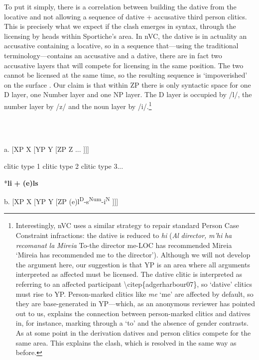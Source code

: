 \documentclass[output=paper,modfonts,nonflat]{langsci/langscibook}
\begin{document}
To put it simply, there is a correlation between building the dative from the locative and not allowing a sequence of dative + accusative third person clitics. This is precisely what we expect if the clash emerges in syntax, through the licensing by heads within Sportiche’s area. In nVC, the dative is in actuality an accusative containing a locative, so in a sequence that—using the traditional terminology—contains an accusative and a dative, there are in fact two accusative layers that will compete for licensing in the same position. The two cannot be licensed at the same time, so the resulting sequence is ‘impoverished’ on the surface . Our claim is that within ZP there is only syntactic space for one D layer, one Number layer and one NP layer. The D layer is occupied by /l/, the number layer by /z/ and the noun layer by /i/.\footnote{Interestingly, nVC uses a similar strategy to repair standard Person Case Constraint infractions: the dative is reduced to \textit{hi} (\textit{Al} \textit{director,} \textit{m’hi} \textit{ha} \textit{recomanat} \textit{la} \textit{Mireia} To-the director me-LOC has recommended Mireia ‘Mireia has recommended me to the director’). Although we will not develop the argument here, our suggestion is that YP is an area where all arguments interpreted as affected must be licensed. The dative clitic is interpreted as referring to an affected participant {\textbackslash}citep\{adgerharbour07\}, so ‘dative’ clitics must rise to YP. Person-marked clitics like \textit{me} ‘me’ are affected by default, so they are base{}-generated in YP—which, as an anonymous reviewer has pointed out to us, explains the connection between person-marked clitics and datives in, for instance, marking through a ‘to’ and the absence of gender contrasts. As at some point in the derivation datives and person clitics compete for the same area. This explains the clash, which is resolved in the same way as before.}  

\ea%
    \label{ex:key:16}
    \gll\\
        \\
    \glt
    \z

           a. [XP  X  [YP    Y  [ZP  Z  ...  ]]]

     clitic type 1  clitic type 2    clitic type 3...

              *\textbf{li} \textbf{+} \textbf{(e)ls}

   b. [XP  X  [YP    Y  [ZP (e)l\textsuperscript{D}{}-s\textsuperscript{Num}{}-i\textsuperscript{N}     ]]]
\end{document}
